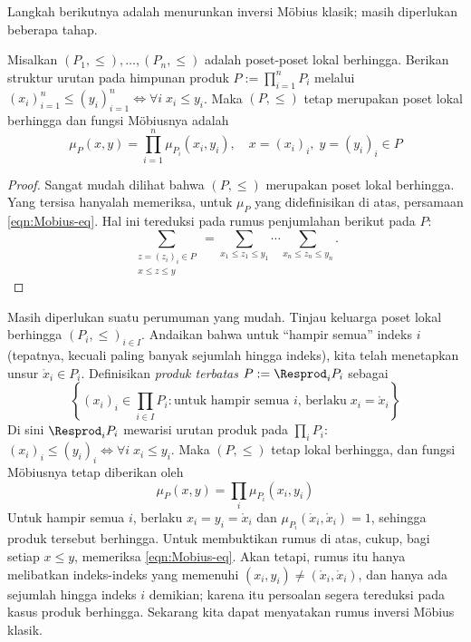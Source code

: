 Langkah berikutnya adalah menurunkan inversi Möbius klasik; masih diperlukan beberapa tahap.
\begin{lemma}\label{prop:Mobius-prod}
	Misalkan $(P_1, \leq), \ldots, (P_n, \leq)$ adalah poset-poset lokal berhingga. Berikan struktur urutan pada himpunan produk $P := \prod_{i=1}^n P_i$ melalui $(x_i)_{i=1}^n \leq (y_i)_{i=1}^n \iff \forall i\; x_i \leq y_i$. Maka $(P, \leq)$ tetap merupakan poset lokal berhingga dan fungsi Möbiusnya adalah
	\[ \mu_P\left( x, y \right) = \prod_{i=1}^n \mu_{P_i}(x_i, y_i), \quad x=(x_i)_i, \; y=(y_i)_i \in P \]
\end{lemma}
\begin{proof}
	Sangat mudah dilihat bahwa $(P, \leq)$ merupakan poset lokal berhingga. Yang tersisa hanyalah memeriksa, untuk $\mu_P$ yang didefinisikan di atas, persamaan \eqref{eqn:Mobius-eq}. Hal ini tereduksi pada rumus penjumlahan berikut pada $P$:
	\begin{equation*}
		\sum_{\substack{z = (z_i)_i \in P \\ x \leq z \leq y}} = \sum_{x_1 \leq z_1 \leq y_1} \cdots \sum_{x_n \leq z_n \leq y_n}.
	\end{equation*}
\end{proof}

Masih diperlukan suatu perumuman yang mudah. Tinjau keluarga poset lokal berhingga $(P_i, \leq)_{i \in I}$. Andaikan bahwa untuk “hampir semua” indeks $i$ (tepatnya, kecuali paling banyak sejumlah hingga indeks), kita telah menetapkan unsur $\mathring{x}_i \in P_i$. Definisikan \emph{produk terbatas} $P := \Resprod_i P_i$ sebagai
\[ \left\{ (x_i)_i \in \prod_{i \in I} P_i : \text{untuk hampir semua $i$, berlaku}\; x_i = \mathring{x}_i  \right\} \]
Di sini $\Resprod_i P_i$ mewarisi urutan produk pada $\prod_i P_i$: $(x_i)_i \leq (y_i)_i \iff \forall i\; x_i \leq y_i$. Maka $(P, \leq)$ tetap lokal berhingga, dan fungsi Möbiusnya tetap diberikan oleh
\[ \mu_P\left( x, y \right) = \prod_i \mu_{P_i}(x_i, y_i) \]
Untuk hampir semua $i$, berlaku $x_i = y_i = \mathring{x}_i$ dan $\mu_{P_i}(\mathring{x}_i, \mathring{x}_i)=1$, sehingga produk tersebut berhingga. Untuk membuktikan rumus di atas, cukup, bagi setiap $x \leq y$, memeriksa \eqref{eqn:Mobius-eq}. Akan tetapi, rumus itu hanya melibatkan indeks-indeks yang memenuhi $(x_i,y_i) \neq (\mathring{x}_i,\mathring{x}_i)$, dan hanya ada sejumlah hingga indeks $i$ demikian; karena itu persoalan segera tereduksi pada kasus produk berhingga. Sekarang kita dapat menyatakan rumus inversi Möbius klasik.

